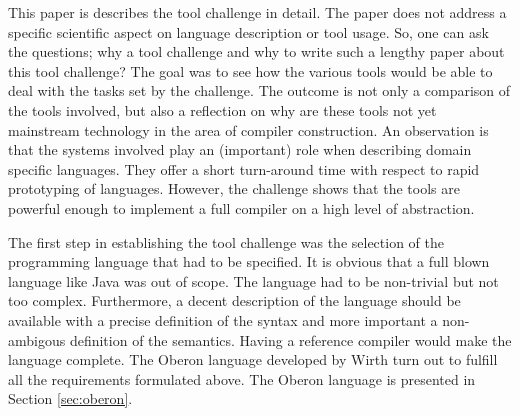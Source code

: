 \documentclass[english,preprint,12pt]{elsarticle}
\begin{document}
This paper is describes the tool challenge in detail. The paper does not address a specific scientific
aspect on language description or tool usage. So, one can ask the questions; why a tool challenge
and why to write such a lengthy paper about this tool challenge? The goal was to see how the various
tools would be able to deal with the tasks set by the challenge. The outcome is not only a comparison of 
the tools involved, but also a reflection on why are these tools not yet mainstream technology in the area
of compiler construction. An observation is that the systems involved play an (important) role when
describing domain specific languages. They offer a short turn-around time with respect to rapid prototyping
of languages.
However, the challenge shows that the tools are powerful enough to implement a full compiler on a 
high level of abstraction. 

The first step in establishing the tool challenge
was the selection of the programming language that had to be specified. It is obvious that a full blown
language like Java was out of scope. The language had to be non-trivial but not too complex. Furthermore,
a decent description of the language should be available with a precise definition of the syntax and
more important a non-ambigous definition of the semantics. Having a reference compiler would make the
language complete. The Oberon language \cite{Wirth96} developed by Wirth turn out to fulfill all the
requirements formulated above. The Oberon language is presented in Section \ref{sec:oberon}.
\end{document}
